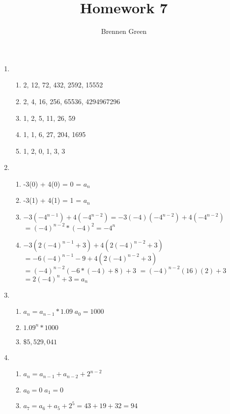 \documentclass[11pt]{article}
\begin{document}
\title{Homework 7}
\author{Brennen Green}
\maketitle


\begin{enumerate}
    \item \begin{enumerate}
        \item 2, 12, 72, 432, 2592, 15552
        \item 2, 4, 16, 256, 65536, 4294967296
        \item 1, 2, 5, 11, 26, 59
        \item 1, 1, 6, 27, 204, 1695
        \item 1, 2, 0, 1, 3, 3
    \end{enumerate}
    \item \begin{enumerate}
        \item -3(0) + 4(0) = 0 = $a_n$
        \item -3(1) + 4(1) = 1 = $a_n$
        \item $-3(-4^{n-1}) + 4(-4^{n-2}) = -3(-4)(-4^{n-2}) + 4(-4^{n-2})$
        $ = (-4)^{n-2}*(-4)^2 = -4^n$
        \item $ -3(2(-4)^{n-1}+3)+4(2(-4)^{n-2}+3) $\newline
        $ = -6(-4)^{n-1}-9+4(2(-4)^{n-2}+3)$\newline
        $ = (-4)^{n-2}(-6*(-4)+8)+3 $\newline
        $ = (-4)^{n-2}(16)(2)+3 $\newline
        $ = 2(-4)^n + 3 = a_n $
    \end{enumerate}
    \item \begin{enumerate}
        \item $ a_n = a_{n-1}*1.09 \; a_0 = 1000$
        \item $ 1.09^n * 1000 $
        \item $ \$5,529,041 $
    \end{enumerate}
    \item \begin{enumerate}
        \item $a_n = a_{n-1} + a_{n-2} + 2^{n-2}$
        \item $a_0 = 0 \; a_1=0 \;$
        \item $a_7 = a_6 + a_5 + 2^5 = 43 + 19 + 32 = 94$
    \end{enumerate}

\end{enumerate}
\end{document}

